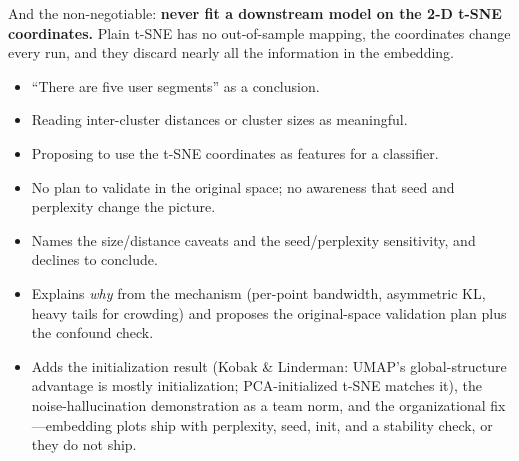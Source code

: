 \begin{interviewq}
And the non-negotiable: \textbf{never fit a downstream model on the 2-D t-SNE coordinates.} Plain t-SNE has no out-of-sample mapping, the coordinates change every run, and they discard nearly all the information in the embedding.

\redflags
\begin{itemize}
    \item ``There are five user segments'' as a conclusion.
    \item Reading inter-cluster distances or cluster sizes as meaningful.
    \item Proposing to use the t-SNE coordinates as features for a classifier.
    \item No plan to validate in the original space; no awareness that seed and perplexity change the picture.
\end{itemize}


\goodgreat
\begin{itemize}
    \item {} Names the size/distance caveats and the seed/perplexity sensitivity, and declines to conclude.
    \item {} Explains \emph{why} from the mechanism (per-point bandwidth, asymmetric KL, heavy tails for crowding) and proposes the original-space validation plan plus the confound check.
    \item {} Adds the initialization result (Kobak \& Linderman: UMAP's global-structure advantage is mostly initialization; PCA-initialized t-SNE matches it), the noise-hallucination demonstration as a team norm, and the organizational fix---embedding plots ship with perplexity, seed, init, and a stability check, or they do not ship.
\end{itemize}

\end{interviewq}

